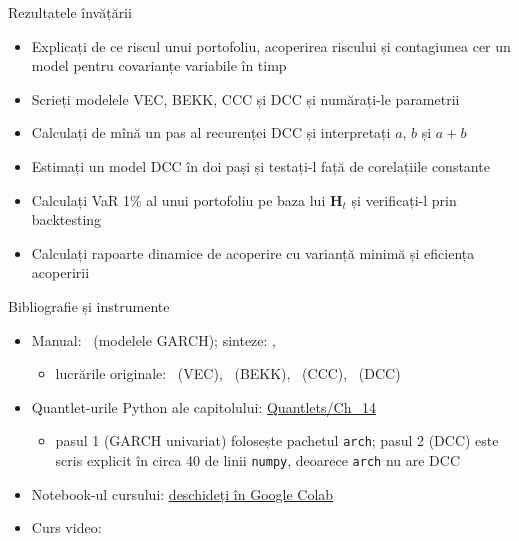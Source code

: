 \begin{frame}{Rezultatele învățării}
\itemsize{\small}
\begin{itemize}
    \item Explicați de ce riscul unui portofoliu, acoperirea riscului și contagiunea cer un model pentru covarianțe variabile în timp
    \item Scrieți modelele VEC, BEKK, CCC și DCC și numărați-le parametrii
    \item Calculați de mînă un pas al recurenței DCC și interpretați $a$, $b$ și $a+b$
    \item Estimați un model DCC în doi pași și testați-l față de corelațiile constante
    \item Calculați VaR 1\% al unui portofoliu pe baza lui $\mathbf{H}_t$ și verificați-l prin backtesting
    \item Calculați rapoarte dinamice de acoperire cu varianță minimă și eficiența acoperirii
\end{itemize}
\end{frame}

\begin{frame}{Bibliografie și instrumente}
\itemsize{\small}
\begin{itemize}
    \item Manual: \ (modelele GARCH); sinteze: , 
    \begin{itemize}
        \item lucrările originale: \ (VEC), \ (BEKK), \ (CCC), \ (DCC)
    \end{itemize}
    \item Quantlet-urile Python ale capitolului: \href{https://github.com/danpele/Time-Series-Analysis/tree/main/Quantlets/Ch_14}{Quantlets/Ch\_14}
    \begin{itemize}
        \item pasul 1 (GARCH univariat) folosește pachetul \texttt{arch}; pasul 2 (DCC) este scris explicit în circa 40 de linii \texttt{numpy}, deoarece \texttt{arch} nu are DCC
    \end{itemize}
    \item Notebook-ul cursului: \href{\colaburl{notebooks/EN/chapter14_lecture_notebook.ipynb}}{deschideți în Google Colab}
    \item Curs video: 
\end{itemize}
\end{frame}


